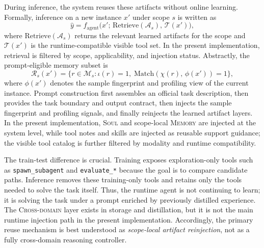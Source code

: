 During inference, the system reuses these artifacts without online learning. Formally, inference on a new instance $x'$ under scope $s$ is written as
\begin{equation}
\hat{y} = f_{\mathrm{agent}}\!\bigl(x';\, \mathrm{Retrieve}(\mathcal{A}_{s}),\, \mathcal{T}(x')\bigr),
\end{equation}
where $\mathrm{Retrieve}(\mathcal{A}_{s})$ returns the relevant learned artifacts for the scope and $\mathcal{T}(x')$ is the runtime-compatible visible tool set. In the present implementation, retrieval is filtered by scope, applicability, and injection status. Abstractly, the prompt-eligible memory subset is
\begin{equation}
\mathcal{R}_{s}(x')=
\bigl\{r \in \mathcal{M}_{s} : \iota(r)=1,\; \mathrm{Match}(\chi(r),\, \phi(x'))=1\bigr\},
\end{equation}
where $\phi(x')$ denotes the sample fingerprint and profiling view of the current instance. Prompt construction first assembles an official task description, then provides the task boundary and output contract, then injects the sample fingerprint and profiling signals, and finally reinjects the learned artifact layers. In the present implementation, \textsc{Soul} and scope-local \textsc{Memory} are injected at the system level, while tool notes and skills are injected as reusable support guidance; the visible tool catalog is further filtered by modality and runtime compatibility.

The train-test difference is crucial. Training exposes exploration-only tools such as \texttt{spawn\_subagent} and \texttt{evaluate\_*} because the goal is to compare candidate paths. Inference removes these training-only tools and retains only the tools needed to solve the task itself. Thus, the runtime agent is not continuing to learn; it is solving the task under a prompt enriched by previously distilled experience. The \textsc{Cross-domain} layer exists in storage and distillation, but it is not the main runtime injection path in the present implementation. Accordingly, the primary reuse mechanism is best understood as \emph{scope-local artifact reinjection}, not as a fully cross-domain reasoning controller.




